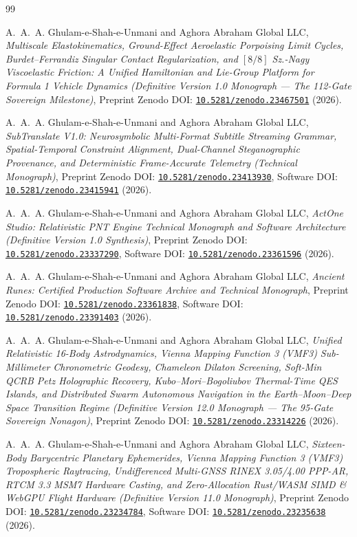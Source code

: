\documentclass[11pt,a4paper,reqno]{article}
\newcommand{\zenodo}[1]{\href{https://doi.org/10.5281/zenodo.#1}{\nolinkurl{10.5281/zenodo.#1}}}
\theoremstyle{plain}
\theoremstyle{definition}
\theoremstyle{remark}
\numberwithin{equation}{section}
\begin{document}
\begin{thebibliography}{99}

A.~A.~A. Ghulam-e-Shah-e-Unmani and {Aghora Abraham Global LLC},
\emph{Multiscale Elastokinematics, Ground-Effect Aeroelastic Porpoising Limit Cycles, Burdet--Ferrandiz Singular Contact Regularization, and $[8/8]$ Sz.-Nagy Viscoelastic Friction: A Unified Hamiltonian and Lie-Group Platform for Formula 1 Vehicle Dynamics (Definitive Version 1.0 Monograph --- The 112-Gate Sovereign Milestone)},
Preprint Zenodo DOI: \zenodo{23467501} (2026).

A.~A.~A. Ghulam-e-Shah-e-Unmani and {Aghora Abraham Global LLC},
\emph{SubTranslate V1.0: Neurosymbolic Multi-Format Subtitle Streaming Grammar, Spatial-Temporal Constraint Alignment, Dual-Channel Steganographic Provenance, and Deterministic Frame-Accurate Telemetry (Technical Monograph)},
Preprint Zenodo DOI: \zenodo{23413930}, Software DOI: \zenodo{23415941} (2026).

A.~A.~A. Ghulam-e-Shah-e-Unmani and {Aghora Abraham Global LLC},
\emph{ActOne Studio: Relativistic PNT Engine Technical Monograph and Software Architecture (Definitive Version 1.0 Synthesis)},
Preprint Zenodo DOI: \zenodo{23337290}, Software DOI: \zenodo{23361596} (2026).

A.~A.~A. Ghulam-e-Shah-e-Unmani and {Aghora Abraham Global LLC},
\emph{Ancient Runes: Certified Production Software Archive and Technical Monograph},
Preprint Zenodo DOI: \zenodo{23361838}, Software DOI: \zenodo{23391403} (2026).

A.~A.~A. Ghulam-e-Shah-e-Unmani and {Aghora Abraham Global LLC},
\emph{Unified Relativistic 16-Body Astrodynamics, Vienna Mapping Function 3 (VMF3) Sub-Millimeter Chronometric Geodesy, Chameleon Dilaton Screening, Soft-Min QCRB Petz Holographic Recovery, Kubo--Mori--Bogoliubov Thermal-Time QES Islands, and Distributed Swarm Autonomous Navigation in the Earth--Moon--Deep Space Transition Regime (Definitive Version 12.0 Monograph --- The 95-Gate Sovereign Nonagon)},
Preprint Zenodo DOI: \zenodo{23314226} (2026).

A.~A.~A. Ghulam-e-Shah-e-Unmani and {Aghora Abraham Global LLC},
\emph{Sixteen-Body Barycentric Planetary Ephemerides, Vienna Mapping Function 3 (VMF3) Tropospheric Raytracing, Undifferenced Multi-GNSS RINEX 3.05/4.00 PPP-AR, RTCM 3.3 MSM7 Hardware Casting, and Zero-Allocation Rust/WASM SIMD \& WebGPU Flight Hardware (Definitive Version 11.0 Monograph)},
Preprint Zenodo DOI: \zenodo{23234784}, Software DOI: \zenodo{23235638} (2026).


\end{thebibliography}
\end{document}
